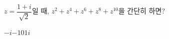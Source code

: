 $z=\dfrac{1+i}{\sqrt{2}}$일 때, $z^2+z^4+z^6+z^8+z^{10}$을 간단히 하면?
\begin{choices32}{$-i$}{$-1$}{$0$}{$1$}{$i$}\end{choices32}
